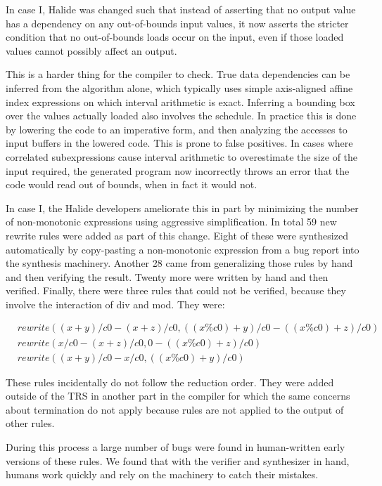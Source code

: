 \documentclass[acmsmall,review,anonymous]{acmart}\settopmatter{printfolios=true,printccs=false,printacmref=false}
\begin{document}
In case I, Halide was changed such that instead of asserting that no output value has a dependency on any out-of-bounds input values, it now asserts the stricter condition that no out-of-bounds loads occur on the input, even if those loaded values cannot possibly affect an output.

This is a harder thing for the compiler to check. True data dependencies can be inferred from the algorithm alone, which typically uses simple axis-aligned affine index expressions on which interval arithmetic is exact. Inferring a bounding box over the values actually loaded also involves the schedule. In practice this is done by lowering the code to an imperative form, and then analyzing the accesses to input buffers in the lowered code. This is prone to false positives. In cases where correlated subexpressions cause interval arithmetic to overestimate the size of the input required, the generated program now incorrectly throws an error that the code would read out of bounds, when in fact it would not.

In case I, the Halide developers ameliorate this in part by minimizing the number of non-monotonic expressions using aggressive simplification. In total 59 new rewrite rules were added as part of this change. Eight of these were synthesized automatically by copy-pasting a non-monotonic expression from a bug report into the synthesis machinery. Another 28 came from generalizing those rules by hand and then verifying the result. Twenty more were written by hand and then verified. Finally, there were three rules that could not be verified, because they involve the interaction of div and mod. They were:

\begin{align*}
& rewrite((x + y) / c0 - (x + z) / c0, ((x \% c0) + y) / c0 - ((x \% c0) + z) / c0) \\
& rewrite(x / c0 - (x + z) / c0, 0 - ((x \% c0) + z) / c0) \\
& rewrite((x + y) / c0 - x / c0, ((x \% c0) + y) / c0)
\end{align*}

These rules incidentally do not follow the reduction order. They were added outside of the TRS in another part in the compiler for which the same concerns about termination do not apply because rules are not applied to the output of other rules.

During this process a large number of bugs were found in human-written early versions of these rules. We found that with the verifier and synthesizer in hand, humans work quickly and rely on the machinery to catch their mistakes.
\end{document}
